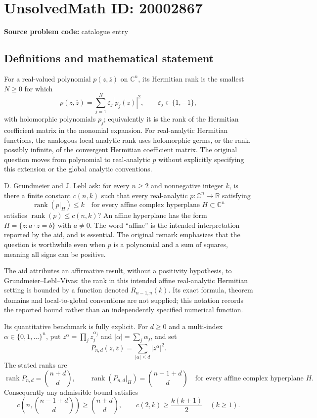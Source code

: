 \documentclass[11pt]{article}
\newcommand{\R}{\mathbb{R}}
\newcommand{\C}{\mathbb{C}}
\newcommand{\eps}{\varepsilon}
\begin{document}
\section*{UnsolvedMath ID: 20002867}
\textbf{Source problem code:} catalogue entry
\subsection{Definitions and mathematical statement}
For a real-valued polynomial $p(z,\overline z)$ on $\C^n$, its Hermitian rank is the smallest $N\geq0$ for which
\[
p(z,\overline z)=\sum_{j=1}^N\eps_j|p_j(z)|^2,\qquad \eps_j\in\{1,-1\},
\]
with holomorphic polynomials $p_j$; equivalently it is the rank of the Hermitian coefficient matrix in the monomial expansion. For real-analytic Hermitian functions, the analogous local analytic rank uses holomorphic germs, or the rank, possibly infinite, of the convergent Hermitian coefficient matrix. The original question moves from polynomial to real-analytic $p$ without explicitly specifying this extension or the global analytic conventions.

D. Grundmeier and J. Lebl ask: for every $n\geq2$ and nonnegative integer $k$, is there a finite constant $c(n,k)$ such that every real-analytic $p:\C^n\to\R$ satisfying
\[
\operatorname{rank}(p|_H)\leq k\quad\text{for every affine complex hyperplane }H\subset\C^n
\]
satisfies $\operatorname{rank}(p)\leq c(n,k)$? An affine hyperplane has the form $H=\{z:a\cdot z=b\}$ with $a\ne0$. The word ``affine'' is the intended interpretation reported by the aid, and is essential. The original remark emphasizes that the question is worthwhile even when $p$ is a polynomial and a sum of squares, meaning all signs can be positive.

The aid attributes an affirmative result, without a positivity hypothesis, to Grundmeier--Lebl--Vivas: the rank in this intended affine real-analytic Hermitian setting is bounded by a function denoted $R_{n-1,n}(k)$. Its exact formula, theorem domains and local-to-global conventions are not supplied; this notation records the reported bound rather than an independently specified numerical function.

Its quantitative benchmark is fully explicit. For $d\geq0$ and a multi-index $\alpha\in\{0,1,\ldots\}^n$, put $z^\alpha=\prod_jz_j^{\alpha_j}$ and $|\alpha|=\sum_j\alpha_j$, and set
\[
P_{n,d}(z,\overline z)=\sum_{|\alpha|\leq d}|z^\alpha|^2.
\]
The stated ranks are
\[
\operatorname{rank}P_{n,d}=\binom{n+d}{d},\qquad
\operatorname{rank}(P_{n,d}|_H)=\binom{n-1+d}{d}
\quad\text{for every affine complex hyperplane }H.
\]
Consequently any admissible bound satisfies
\[
c\left(n,\binom{n-1+d}{d}\right)\geq\binom{n+d}{d},
\qquad c(2,k)\geq\frac{k(k+1)}2\quad(k\geq1).
\]
\end{document}
